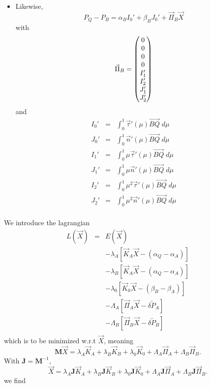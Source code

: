 \documentclass[11pt]{amsart}
\newcommand{\myvec}[1]{\overrightarrow{#1}}
\newcommand{\mymat}[1]{\mathbf{#1}}
\begin{document}
\begin{itemize}
	\item
	Likewise,
	\[
		P_Q - P_B = \alpha_B I_0' + \beta_B J_0' + \vec{\Pi}_B \vec{X}
	\]
	with
	\[
	\vec{\Pi}_B =
		\begin{pmatrix}
			0\cr
			0\cr
			0\cr
			0\cr
			I_1'\cr
			I_2'\cr
			J_1'\cr
			J_2'\cr
		\end{pmatrix}
	\]
	and
	\[
		\begin{array}{rcl}
		I_0' & = & \int_0^1 \vec{\tau}'(\mu)\myvec{BQ}\;d\mu\\
		J_0' & = & \int_0^1 \vec{n}'(\mu)\myvec{BQ}\;d\mu\\
		I_1' & = & \int_0^1 \mu\vec{\tau}'(\mu)\myvec{BQ}\;d\mu\\
		J_1' & = & \int_0^1 \mu\vec{n}'(\mu)\myvec{BQ}\;d\mu\\
		I_2' & = & \int_0^1 \mu^2\vec{\tau}'(\mu)\myvec{BQ}\;d\mu\\
		J_2' & = & \int_0^1 \mu^2\vec{n}'(\mu)\myvec{BQ}\;d\mu\\
		\end{array}
	\]
\end{itemize}
We introduce the lagrangian
\[
	\begin{array}{rcl}
	L(\vec{X}) &=& E(\vec{X}) \\
	           & & - \lambda_A\left[ \vec{K}_A\vec{X}   - (\alpha_Q-\alpha_A)\right]\\
	           & & - \lambda_B\left[ \vec{K}_A\vec{X}   - (\alpha_Q-\alpha_A)\right]\\
	           & & - \lambda_0\left[ \vec{K}_0\vec{X}   - (\beta_B-\beta_A)\right]\\
	           & & - \Lambda_A\left[ \vec{\Pi}_A\vec{X} - \delta\tilde{P}_A\right]\\
	           & & - \Lambda_B\left[ \vec{\Pi}_B\vec{X} - \delta\tilde{P}_B\right]\\
	\end{array}
\]
which is to be minimized w.r.t $\vec{X}$, meaning
\[
	\mymat{M}\vec{X}  = 
	\lambda_A \vec{K}_A +
	\lambda_B \vec{K}_B +
	\lambda_0 \vec{K}_0 +
	\Lambda_A \vec{\Pi}_A +
	\Lambda_B \vec{\Pi}_B.
\]
With $\mymat{J}=\mymat{M}^{-1}$,
\[
	\vec{X} = \lambda_A \mymat{J}\vec{K}_A +
	\lambda_B \mymat{J}\vec{K}_B +
	\lambda_0 \mymat{J}\vec{K}_0 +
	\Lambda_A \mymat{J}\vec{\Pi}_A +
	\Lambda_B \mymat{J}\vec{\Pi}_B.
\]
we find
\end{document}

